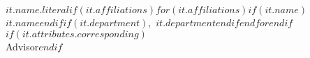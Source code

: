 $it.name.literal$$if(it.affiliations)$$for(it.affiliations)$$if(it.name)$\\$it.name$$endif$$if(it.department)$,~$it.department$$endif$$endfor$$endif$$if(it.attributes.corresponding)$\\Advisor$endif$\\